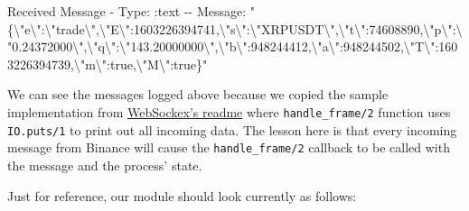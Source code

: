 \documentclass[
]{book}
\newenvironment{Shaded}{\begin{snugshade}}{\end{snugshade}}
\newcommand{\AttributeTok}[1]{\textcolor[rgb]{0.77,0.63,0.00}{#1}}
\newcommand{\DataTypeTok}[1]{\textcolor[rgb]{0.13,0.29,0.53}{#1}}
\newcommand{\ExtensionTok}[1]{#1}
\newcommand{\NormalTok}[1]{#1}
\newcommand{\StringTok}[1]{\textcolor[rgb]{0.31,0.60,0.02}{#1}}
\begin{document}
\begin{Shaded}
\begin{Highlighting}[]
\ExtensionTok{Received}\NormalTok{ Message }\AttributeTok{{-}}\NormalTok{ Type: :text }\AttributeTok{{-}{-}}\NormalTok{ Message: }\StringTok{"\{}\DataTypeTok{\textbackslash{}"}\StringTok{e}\DataTypeTok{\textbackslash{}"}\StringTok{:}\DataTypeTok{\textbackslash{}"}\StringTok{trade}\DataTypeTok{\textbackslash{}"}\StringTok{,}\DataTypeTok{\textbackslash{}"}\StringTok{E}\DataTypeTok{\textbackslash{}"}\StringTok{:1603226394741,}\DataTypeTok{\textbackslash{}"}\StringTok{s}\DataTypeTok{\textbackslash{}"}\StringTok{:}\DataTypeTok{\textbackslash{}"}\StringTok{XRPUSDT}\DataTypeTok{\textbackslash{}"}\StringTok{,}\DataTypeTok{\textbackslash{}"}\StringTok{t}\DataTypeTok{\textbackslash{}"}\StringTok{:74608890,}\DataTypeTok{\textbackslash{}"}\StringTok{p}\DataTypeTok{\textbackslash{}"}\StringTok{:}\DataTypeTok{\textbackslash{}"}\StringTok{0.24372000}\DataTypeTok{\textbackslash{}"}\StringTok{,}\DataTypeTok{\textbackslash{}"}\StringTok{q}\DataTypeTok{\textbackslash{}"}\StringTok{:}\DataTypeTok{\textbackslash{}"}\StringTok{143.20000000}\DataTypeTok{\textbackslash{}"}\StringTok{,}\DataTypeTok{\textbackslash{}"}\StringTok{b}\DataTypeTok{\textbackslash{}"}\StringTok{:948244412,}\DataTypeTok{\textbackslash{}"}\StringTok{a}\DataTypeTok{\textbackslash{}"}\StringTok{:948244502,}\DataTypeTok{\textbackslash{}"}\StringTok{T}\DataTypeTok{\textbackslash{}"}\StringTok{:1603226394739,}\DataTypeTok{\textbackslash{}"}\StringTok{m}\DataTypeTok{\textbackslash{}"}\StringTok{:true,}\DataTypeTok{\textbackslash{}"}\StringTok{M}\DataTypeTok{\textbackslash{}"}\StringTok{:true\}"}
\end{Highlighting}
\end{Shaded}

We can see the messages logged above because we copied the sample implementation from \href{https://github.com/Azolo/websockex}{WebSockex's readme} where \texttt{handle\_frame/2} function uses \texttt{IO.puts/1} to print out all incoming data. The lesson here is that every incoming message from Binance will cause the \texttt{handle\_frame/2} callback to be called with the message and the process' state.

Just for reference, our module should look currently as follows:
\end{document}
